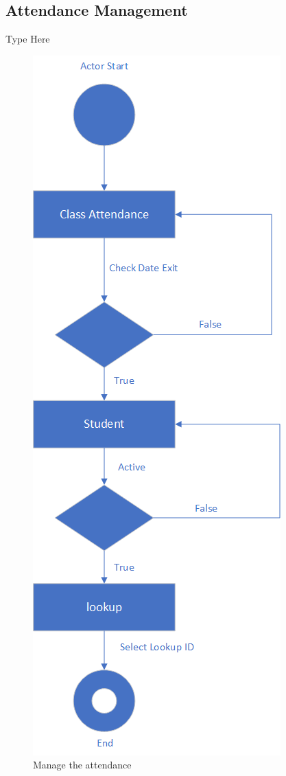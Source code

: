 \documentclass[12pt,a4paper]{article}
\begin{document}
\subsection{Attendance Management}
Type Here
\begin{figure}[H]
  \centering
    \includegraphics[scale=1]{Student Attendance}

    
  \caption{Manage the attendance}
\end{figure}
\end{document}
